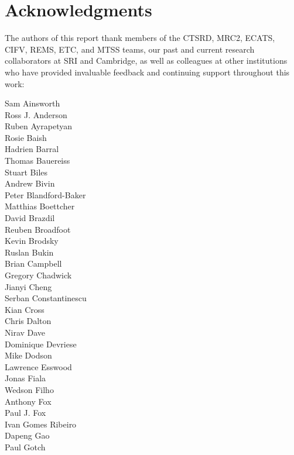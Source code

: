 \section*{Acknowledgments}

\vspace{-0.2cm}

The authors of this report thank members of the CTSRD, MRC2, ECATS,
CIFV, REMS, ETC, and MTSS teams, our past and current research collaborators at SRI and
Cambridge, as well as colleagues at other institutions who have provided
invaluable feedback and continuing support throughout this work:

\medskip

\begin{small}
\noindent\begin{autogrid}{4}
Sam Ainsworth \\
Ross J. Anderson \\
Ruben Ayrapetyan \\
Rosie Baish \\
Hadrien Barral \\
Thomas Bauereiss \\
Stuart Biles \\
Andrew Bivin \\
Peter Blandford-Baker \\
Matthias Boettcher \\
David Brazdil \\
Reuben Broadfoot \\
Kevin Brodsky \\
Ruslan Bukin \\
Brian Campbell \\
Gregory Chadwick \\
Jianyi Cheng \\
Serban Constantinescu \\
Kian Cross \\
Chris Dalton \\
Nirav Dave \\
Dominique Devriese \\
Mike Dodson \\
Lawrence Esswood \\
Jonas Fiala \\
Wedson Filho \\
Anthony Fox \\
Paul J. Fox \\
Ivan Gomes Ribeiro \\
Dapeng Gao \\
Paul Gotch \\

\end{autogrid}
\end{small}
